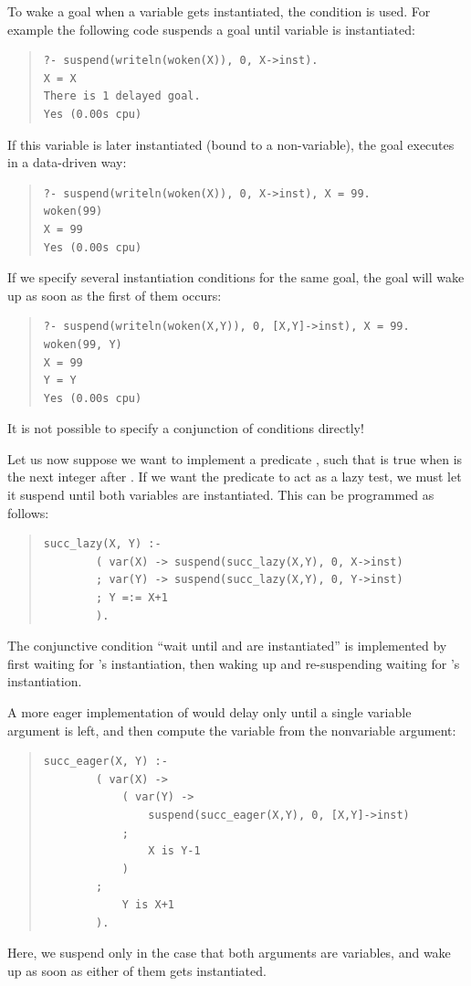To wake a goal when a variable gets instantiated, the 
condition is used. For example the following code suspends a goal until
variable  is instantiated:
\begin{quote}
\begin{verbatim}
?- suspend(writeln(woken(X)), 0, X->inst).
X = X
There is 1 delayed goal.
Yes (0.00s cpu)
\end{verbatim}
\end{quote}
If this variable is later instantiated (bound to a non-variable),
the goal executes in a data-driven way:
\begin{quote}
\begin{verbatim}
?- suspend(writeln(woken(X)), 0, X->inst), X = 99.
woken(99)
X = 99
Yes (0.00s cpu)
\end{verbatim}
\end{quote}
If we specify several instantiation conditions for the same goal,
the goal will wake up as soon as the first of them occurs:
\begin{quote}
\begin{verbatim}
?- suspend(writeln(woken(X,Y)), 0, [X,Y]->inst), X = 99.
woken(99, Y)
X = 99
Y = Y
Yes (0.00s cpu)
\end{verbatim}
\end{quote}
It is not possible to specify a conjunction of conditions directly!

Let us now suppose we want to implement a predicate , such that
is true when  is the next integer after . If we want the
predicate
to act as a lazy test, we must let it suspend until both variables
are instantiated. This can be programmed as follows:
\begin{quote}
\begin{verbatim}
succ_lazy(X, Y) :-
        ( var(X) -> suspend(succ_lazy(X,Y), 0, X->inst)
        ; var(Y) -> suspend(succ_lazy(X,Y), 0, Y->inst)
        ; Y =:= X+1
        ).
\end{verbatim}
\end{quote}
The conjunctive condition ``wait until  and  are
instantiated''
is
implemented by first waiting for 's instantiation, then waking up and
re-suspending waiting for 's instantiation.

A more eager implementation of  would delay only until
a single variable argument is left, and then compute the variable from
the nonvariable argument:
\begin{quote}
\begin{verbatim}
succ_eager(X, Y) :-
        ( var(X) ->
            ( var(Y) ->
                suspend(succ_eager(X,Y), 0, [X,Y]->inst)
            ;
                X is Y-1
            )
        ;
            Y is X+1
        ).
\end{verbatim}
\end{quote}
Here, we suspend only in the case that both arguments are variables,
and wake up as soon as either of them gets instantiated.

